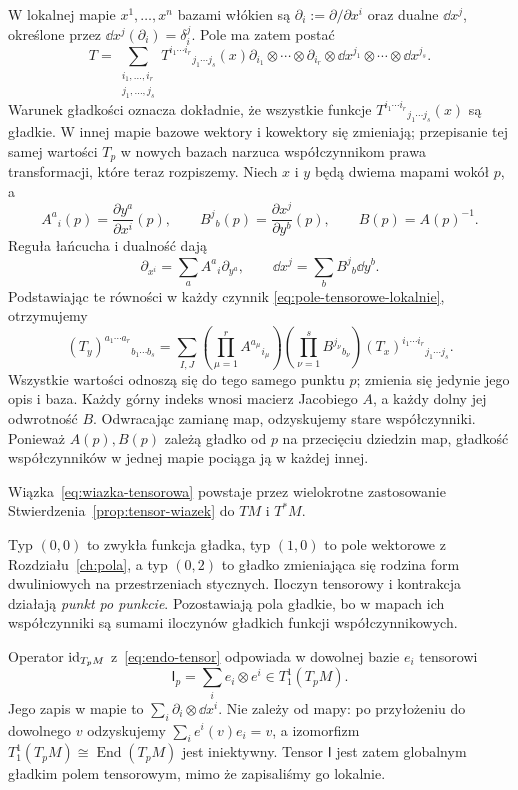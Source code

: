 W lokalnej mapie $x^1,\ldots,x^n$ bazami włókien są
$\partial_i:=\partial/\partial x^i$ oraz dualne
$\dd x^j$, określone przez $\dd x^j(\partial_i)=\delta_i^j$.
Pole ma zatem postać
\begin{equation}\label{eq:pole-tensorowe-lokalnie}
 T=\sum_{\substack{i_1,\ldots,i_r\\j_1,\ldots,j_s}}
 T^{i_1\cdots i_r}{}_{j_1\cdots j_s}(x)
 \partial_{i_1}\otimes\cdots\otimes\partial_{i_r}
 \otimes\dd x^{j_1}\otimes\cdots\otimes\dd x^{j_s}.
\end{equation}
Warunek gładkości oznacza dokładnie, że wszystkie funkcje
$T^{i_1\cdots i_r}{}_{j_1\cdots j_s}(x)$ są gładkie.
W innej mapie bazowe wektory i kowektory się zmieniają;
przepisanie tej samej wartości $T_p$ w nowych bazach
narzuca współczynnikom prawa transformacji, które teraz rozpiszemy.
Niech $x$ i $y$ będą dwiema mapami wokół $p$, a
\[
 A^a{}_i(p)=\frac{\partial y^a}{\partial x^i}(p),\qquad
 B^j{}_b(p)=\frac{\partial x^j}{\partial y^b}(p),\qquad B(p)=A(p)^{-1}.
\]
Reguła łańcucha i dualność dają
\[
 \partial_{x^i}=\sum_a A^a{}_i\partial_{y^a},\qquad
 \dd x^j=\sum_b B^j{}_b\dd y^b.
\]
Podstawiając te równości w każdy czynnik
\eqref{eq:pole-tensorowe-lokalnie}, otrzymujemy
\begin{equation}\label{eq:tensor-zmiana-wspolrzednych}
 (T_y)^{a_1\cdots a_r}{}_{b_1\cdots b_s}
 =\sum_{I,J}
 \left(\prod_{\mu=1}^r A^{a_\mu}{}_{i_\mu}\right)
 \left(\prod_{\nu=1}^s B^{j_\nu}{}_{b_\nu}\right)
 (T_x)^{i_1\cdots i_r}{}_{j_1\cdots j_s}.
\end{equation}
Wszystkie wartości odnoszą się do tego samego punktu $p$;
zmienia się jedynie jego opis i baza. Każdy górny indeks wnosi
macierz Jacobiego $A$, a każdy dolny jej odwrotność $B$.
Odwracając zamianę map, odzyskujemy stare współczynniki.
Ponieważ $A(p),B(p)$ zależą gładko od $p$ na przecięciu
dziedzin map, gładkość współczynników w jednej
mapie pociąga ją w każdej innej.

Wiązka~\eqref{eq:wiazka-tensorowa} powstaje
przez wielokrotne zastosowanie
Stwierdzenia~\ref{prop:tensor-wiazek} do $TM$ i $T^*M$.

Typ $(0,0)$ to zwykła funkcja gładka, typ $(1,0)$ to
pole wektorowe z Rozdziału~\ref{ch:pola}, a typ $(0,2)$
to gładko zmieniająca się rodzina form dwuliniowych
na przestrzeniach stycznych. Iloczyn tensorowy i kontrakcja
działają \emph{punkt po punkcie}. Pozostawiają pola gładkie,
bo w mapach ich współczynniki są sumami iloczynów
gładkich funkcji współczynnikowych.

\begin{przyklad}
Operator $\mathrm{id}_{T_pM}$ z~\eqref{eq:endo-tensor} odpowiada
w dowolnej bazie $e_i$ tensorowi
\[
 \mathsf I_p=\sum_i e_i\otimes e^i\in T^1_1(T_pM).
\]
Jego zapis w mapie to $\sum_i\partial_i\otimes\dd x^i$.
Nie zależy od mapy: po przyłożeniu do dowolnego $v$
odzyskujemy $\sum_i e^i(v)e_i=v$, a izomorfizm
$T^1_1(T_pM)\cong\operatorname{End}(T_pM)$ jest
iniektywny. Tensor $\mathsf I$ jest zatem globalnym
gładkim polem tensorowym, mimo że zapisaliśmy go lokalnie.
\end{przyklad}


